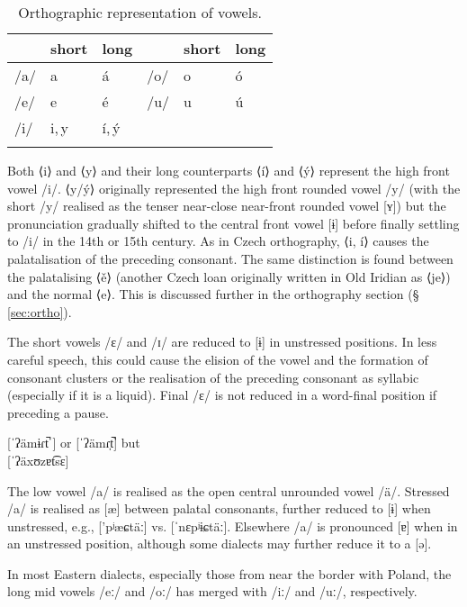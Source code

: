 \begin{table}[ht!]
	\footnotesize\sffamily
	\caption{Orthographic representation of vowels.}
	\medskip
	\begin{tabularx}{0.7\textwidth}{@{}YYYYYY@{}}
		\toprule
		& {\sc short} & {\sc long} & & {\sc short} & {\sc long}\\
		\midrule
		/a/ & a 	&á 			& /o/ 	& o &ó \\
		/e/ & e 	&é 			& /u/ 	& u &ú\\
		/i/ & i,\,y &í,\,\'y 	& 		& 	&\\
		\bottomrule
		\label{table:vowels-orth}
	\end{tabularx}
\end{table}

Both ⟨i⟩ and ⟨y⟩ and their long counterparts ⟨í⟩ and ⟨ý⟩ represent the high front vowel /i/. ⟨y/ý⟩ originally represented the high front rounded vowel /y/ (with the short /y/ realised as the tenser near-close near-front rounded vowel [ʏ]) but the pronunciation gradually shifted to the central front vowel [ɨ] before finally settling to /i/ in the 14th or 15th century. As in Czech orthography, ⟨i, í⟩ causes the palatalisation of the preceding consonant. The same distinction is found between the palatalising ⟨ě⟩ (another Czech loan originally written in Old Iridian as ⟨je⟩) and the normal ⟨e⟩. This is discussed further in the orthography section (\S\,\ref{sec:ortho}).

The short vowels /ɛ/ and /ɪ/ are reduced to [ɨ] in unstressed positions. In less careful speech, this could cause the elision of the vowel and the formation of consonant clusters or the realisation of the preceding consonant as syllabic (especially if it is a liquid). Final /ɛ/ is not reduced in a word-final position if preceding a pause.

\ex
	 [ˈʔämɨɾt̚ ] or [ˈʔämɾ̩t̚] but\\
	 [ˈʔäxʊzɐt͡sɛ]
\xe

The low vowel /a/ is realised as the open central unrounded vowel /\"a/. Stressed /a/ is realised as [\ae] between palatal consonants, further reduced to [ɨ] when unstressed, e.g.,  ['pʲæɕtäː] vs.  [ˈnɛpʲɨɕtäː]. Elsewhere /a/ is pronounced [ɐ] when in an unstressed position, although some dialects may further reduce it to a [ə].

In most Eastern dialects, especially those from near the border with Poland, the long mid vowels /eː/ and /oː/ has merged with /iː/ and /uː/, respectively.

